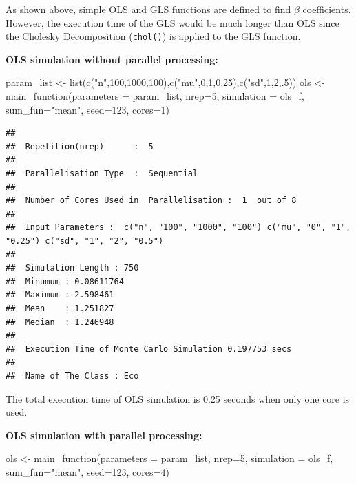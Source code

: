 \documentclass[11pt,a4paper]{article}
\newenvironment{Shaded}{\begin{snugshade}}{\end{snugshade}}
\newcommand{\AttributeTok}[1]{\textcolor[rgb]{0.77,0.63,0.00}{#1}}
\newcommand{\DecValTok}[1]{\textcolor[rgb]{0.00,0.00,0.81}{#1}}
\newcommand{\FloatTok}[1]{\textcolor[rgb]{0.00,0.00,0.81}{#1}}
\newcommand{\FunctionTok}[1]{\textcolor[rgb]{0.00,0.00,0.00}{#1}}
\newcommand{\NormalTok}[1]{#1}
\newcommand{\OtherTok}[1]{\textcolor[rgb]{0.56,0.35,0.01}{#1}}
\newcommand{\StringTok}[1]{\textcolor[rgb]{0.31,0.60,0.02}{#1}}
\begin{document}
As shown above, simple OLS and GLS functions are defined to find
\(\beta\) coefficients. However, the execution time of the GLS would be
much longer than OLS since the Cholesky Decomposition (\texttt{chol()})
is applied to the GLS function.

\textbf{OLS simulation without parallel processing:}

\begin{Shaded}
\begin{Highlighting}[]
\NormalTok{ param\_list }\OtherTok{\textless{}{-}} \FunctionTok{list}\NormalTok{(}\FunctionTok{c}\NormalTok{(}\StringTok{"n"}\NormalTok{,}\DecValTok{100}\NormalTok{,}\DecValTok{1000}\NormalTok{,}\DecValTok{100}\NormalTok{),}\FunctionTok{c}\NormalTok{(}\StringTok{"mu"}\NormalTok{,}\DecValTok{0}\NormalTok{,}\DecValTok{1}\NormalTok{,}\FloatTok{0.25}\NormalTok{),}\FunctionTok{c}\NormalTok{(}\StringTok{"sd"}\NormalTok{,}\DecValTok{1}\NormalTok{,}\DecValTok{2}\NormalTok{,.}\DecValTok{5}\NormalTok{))}
\NormalTok{ols }\OtherTok{\textless{}{-}} \FunctionTok{main\_function}\NormalTok{(}\AttributeTok{parameters =}\NormalTok{ param\_list,}
                     \AttributeTok{nrep=}\DecValTok{5}\NormalTok{,}
                     \AttributeTok{simulation =}\NormalTok{ ols\_f,}
                     \AttributeTok{sum\_fun=}\StringTok{"mean"}\NormalTok{,}
                     \AttributeTok{seed=}\DecValTok{123}\NormalTok{,}
                     \AttributeTok{cores=}\DecValTok{1}\NormalTok{)}
\end{Highlighting}
\end{Shaded}

\begin{verbatim}
## 
##  Repetition(nrep)      :  5 
## 
##  Parallelisation Type  :  Sequential 
## 
##  Number of Cores Used in  Parallelisation :  1  out of 8 
## 
##  Input Parameters :  c("n", "100", "1000", "100") c("mu", "0", "1", "0.25") c("sd", "1", "2", "0.5") 
## 
##  Simulation Length : 750 
##  Minumum : 0.08611764 
##  Maximum : 2.598461 
##  Mean    : 1.251827 
##  Median  : 1.246948 
## 
##  Execution Time of Monte Carlo Simulation 0.197753 secs 
## 
##  Name of The Class : Eco
\end{verbatim}

The total execution time of OLS simulation is 0.25 seconds when only one
core is used.

\textbf{OLS simulation with parallel processing:}

\begin{Shaded}
\begin{Highlighting}[]
\NormalTok{ols }\OtherTok{\textless{}{-}} \FunctionTok{main\_function}\NormalTok{(}\AttributeTok{parameters =}\NormalTok{ param\_list,}
                     \AttributeTok{nrep=}\DecValTok{5}\NormalTok{,}
                     \AttributeTok{simulation =}\NormalTok{ ols\_f,}
                     \AttributeTok{sum\_fun=}\StringTok{"mean"}\NormalTok{,}
                     \AttributeTok{seed=}\DecValTok{123}\NormalTok{,}
                     \AttributeTok{cores=}\DecValTok{4}\NormalTok{)}
\end{Highlighting}
\end{Shaded}
\end{document}
